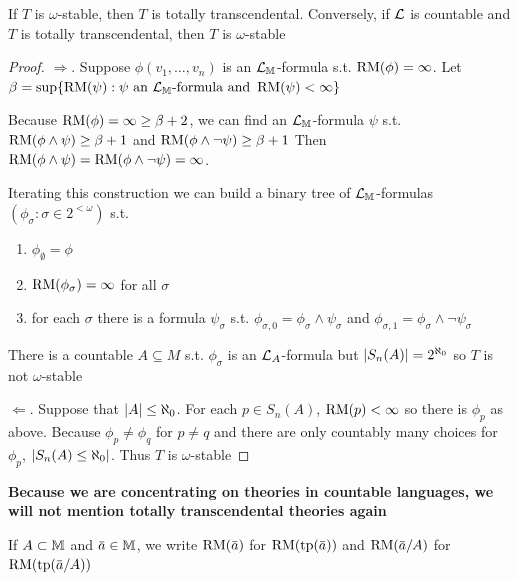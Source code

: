\documentclass[11pt]{article}
\begin{document}
\begin{theorem}[]
If \(T\) is \(\omega\)-stable, then \(T\) is totally transcendental. Conversely, if \(\mathcal{L}\) is countable
and \(T\) is totally transcendental, then \(T\) is \(\omega\)-stable
\end{theorem}

\begin{proof}
\(\Rightarrow\). Suppose \(\phi(v_1,\dots,v_n)\) is an \(\mathcal{L}_{\mathbb{M}}\)-formula s.t. \(\operatorname{RM}(\phi)=\infty\).
Let \(\beta=\sup\{\operatorname{RM}(\psi):\psi\text{ an $\mathcal{L}_{\mathbb{M}}$-formula and }\operatorname{RM}(\psi)<\infty\}\)

Because \(\operatorname{RM}(\phi)=\infty\ge\beta+2\), we can find an \(\mathcal{L}_{\mathbb{M}}\)-formula \(\psi\) s.t. \(\operatorname{RM}(\phi\wedge\psi)\ge\beta+1\)
and \(\operatorname{RM}(\phi\wedge\neg\psi)\ge\beta+1\)
Then \(\operatorname{RM}(\phi\wedge\psi)=\operatorname{RM}(\phi\wedge\neg\psi)=\infty\).

Iterating this construction we can build a binary tree of \(\mathcal{L}_{\mathbb{M}}\)-formulas \((\phi_\sigma:\sigma\in 2^{<\omega})\)
s.t.
\begin{enumerate}
\item \(\phi_\emptyset=\phi\)
\item \(\operatorname{RM}(\phi_\sigma)=\infty\) for all \(\sigma\)
\item for each \(\sigma\) there is a formula \(\psi_\sigma\) s.t. \(\phi_{\sigma,0}=\phi_\sigma\wedge\psi_\sigma\) and \(\phi_{\sigma,1}=\phi_\sigma\wedge\neg\psi_\sigma\)
\end{enumerate}


There is a countable \(A\subseteq M\) s.t. \(\phi_\sigma\) is an \(\mathcal{L}_A\)-formula but \(\abs{S_n(A)}=2^{\aleph_0}\)
so \(T\) is not \(\omega\)-stable

\(\Leftarrow\). Suppose that \(\abs{A}\le\aleph_0\). For each \(p\in S_n(A)\), \(\operatorname{RM}(p)<\infty\) so there is \(\phi_p\) as
above. Because \(\phi_p\neq\phi_q\) for \(p\neq q\) and there are only countably many choices
for \(\phi_p\), \(\abs{S_n(A)\le\aleph_0}\). Thus \(T\) is \(\omega\)-stable
\end{proof}

\textbf{Because we are concentrating on theories in countable languages, we will not mention totally
transcendental theories again}

\begin{definition}[]
If \(A\subset\mathbb{M}\) and \(\bara\in\M\), we write \(\RM(\bara)\) for \(\RM(\tp(\bara))\) and \(\RM(\bara/A)\)
for \(\RM(\tp(\bara/A))\)
\end{definition}
\end{document}
